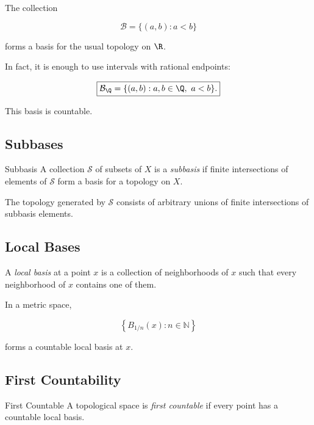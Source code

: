 The collection

\[
\boxed{
\mathcal{B}
=
\{(a,b):a<b\}
}
\]

forms a basis for the usual topology on \(\R\).

In fact, it is enough to use intervals with rational endpoints:

\[
\boxed{
\mathcal{B}_{\Q}
=
\{(a,b):a,b\in\Q,\ a<b\}.
}
\]

This basis is countable.

\subsection{Subbases}
\label{subsec:topological-subbases}

\begin{definitionbox}{Subbasis}
A collection \(\mathcal{S}\) of subsets of \(X\) is a \emph{subbasis} if
finite intersections of elements of \(\mathcal{S}\) form a basis for a
topology on \(X\).
\end{definitionbox}

The topology generated by \(\mathcal{S}\) consists of arbitrary unions of
finite intersections of subbasis elements.

\subsection{Local Bases}
\label{subsec:local-bases}

A \emph{local basis} at a point \(x\) is a collection of neighborhoods of
\(x\) such that every neighborhood of \(x\) contains one of them.

In a metric space,

\[
\boxed{
\left\{
B_{1/n}(x):
n\in\mathbb{N}
\right\}
}
\]

forms a countable local basis at \(x\).

\subsection{First Countability}
\label{subsec:first-countability}

\begin{definitionbox}{First Countable}
A topological space is \emph{first countable} if every point has a countable
local basis.
\end{definitionbox}

